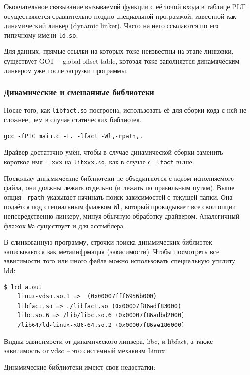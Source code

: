 \documentclass[a4paper,12pt,oneside]{article}
\begin{document}
Окончательное связывание вызываемой функции с её точой входа в таблице PLT осуществляется сравнительно поздно специальной программой, известной как динамический линкер (dynamic linker). Часто на него ссылаются по его типичному имени \lstinline!ld.so!.

Для данных, прямые ссылки на которых тоже неизвестны на этапе линковки, существует GOT -- global offset table, которая тоже заполняется динамическим линкером уже после загрузки программы.

\subsubsection{Динамические и смешанные библиотеки}

После того, как \lstinline!libfact.so! построена, использовать её для сборки кода с ней не сложнее, чем в случае статических библиотек.

\begin{verbatim}
gcc -fPIC main.c -L. -lfact -Wl,-rpath,.
\end{verbatim}

Драйвер достаточно умён, чтобы в случае динамической сборки заменить короткое имя \lstinline!-lxxx! на \lstinline!libxxx.so!, как в случае с \lstinline!-lfact! выше.

Поскольку динамические библиотеки не объединяются с кодом исполняемого файла, они должны лежать отдельно (и лежать по правильным путям). Выше опция \lstinline!-rpath! указывает начинать поиск зависимостей с текущей папки. Она подаётся под специальным флажком \lstinline!Wl!, который прокидывает все свои опции непосредственно линкеру, минуя обычную обработку драйвером. Аналогичный флажок \lstinline!Wa! существует и для ассемблера.

В слинкованную программу, строчки поиска динамических библиотек записываются как метаинфрмация (зависимости). Чтобы посмотреть все зависимости того или иного файла можно использовать специальную утилиту ldd:

\begin{verbatim}
$ ldd a.out 
	linux-vdso.so.1 =>  (0x00007fff6956b000)
	libfact.so => ./libfact.so (0x00007f86adf83000)
	libc.so.6 => /lib/libc.so.6 (0x00007f86adbd2000)
	/lib64/ld-linux-x86-64.so.2 (0x00007f86ae186000)
\end{verbatim}

Видны зависимости от динамического линкера, libc, и libfact, а также зависимость от vdso -- это системный механизм Linux.

Динамические библиотеки имеют свои недостатки:
\end{document}
